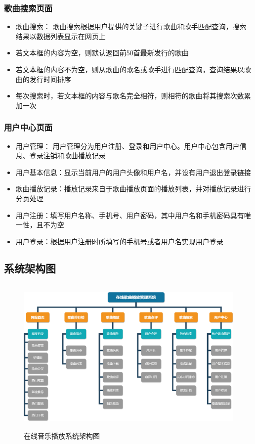 \documentclass[UTF8,14pt]{article}
\numberwithin{figure}{subsubsection}
\numberwithin{table}{subsubsection}
\begin{document}
\subsubsection{歌曲搜索页面}
\begin{itemize}
	\setlength{\itemsep}{0pt}
	      \setlength{\parsep}{0pt}
	      \setlength{\parskip}{0pt}
	\item 歌曲搜索：
	      歌曲搜索根据用户提供的关键子进行歌曲和歌手匹配查询，搜索结果以数据列表显示在网页上
	\item 若文本框的内容为空，则默认返回前50首最新发行的歌曲
	\item 若文本框的内容不为空，则从歌曲的歌名或歌手进行匹配查询，查询结果以歌曲的发行时间排序
	\item 每次搜索时，若文本框的内容与歌名完全相符，则相符的歌曲将其搜索次数累加一次
\end{itemize}
\vspace*{-0.3cm}
\subsubsection{用户中心页面}
\begin{itemize}
	\setlength{\itemsep}{0pt}
	      \setlength{\parsep}{0pt}
	      \setlength{\parskip}{0pt}
	\item 用户管理：
	      用户管理分为用户注册、登录和用户中心。用户中心包含用户信息、登录注销和歌曲播放记录
	\item 用户基本信息：显示当前用户的用户头像和用户名，并设有用户退出登录链接
	\item 歌曲播放记录：播放记录来自于歌曲播放页面的播放列表，并对播放记录进行分页处理
	\item 用户注册：填写用户名称、手机号、用户密码，其中用户名和手机密码具有唯一性，且不为空
	\item 用户登录：根据用户注册时所填写的手机号或者用户名实现用户登录
\end{itemize}


\subsection{系统架构图}
\vspace*{-0.5cm}
\begin{figure}[H]
	\centering
	\includegraphics[width=12.58cm,height=7.76cm]{2.png}
	\caption{在线音乐播放系统架构图}
\end{figure}
\vspace*{-1cm}
\end{document}
